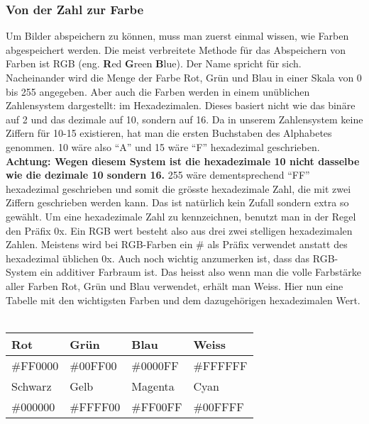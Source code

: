 \subsubsection{Von der Zahl zur Farbe}
Um Bilder abspeichern zu können, muss man zuerst einmal wissen, wie Farben abgespeichert werden. Die meist verbreitete Methode für das Abspeichern von Farben ist RGB (eng. \textbf{R}ed \textbf{G}reen \textbf{B}lue). Der Name spricht für sich. Nacheinander wird die Menge der Farbe Rot, Grün und Blau in einer Skala von 0 bis 255 angegeben. Aber auch die Farben werden in einem unüblichen Zahlensystem dargestellt: im Hexadezimalen. Dieses basiert nicht wie das binäre auf 2 und das dezimale auf 10, sondern auf 16. Da in unserem Zahlensystem keine Ziffern für 10-15 existieren, hat man die ersten Buchstaben des Alphabetes genommen. 10 wäre also "`A"' und 15 wäre "`F"' hexadezimal geschrieben. \textbf{Achtung: Wegen diesem System ist die hexadezimale 10 nicht dasselbe wie die dezimale 10 sondern 16.} 255 wäre dementsprechend "`FF"' hexadezimal geschrieben und somit die grösste hexadezimale Zahl, die mit zwei Ziffern geschrieben werden kann. Das ist natürlich kein Zufall sondern extra so gewählt. Um eine hexadezimale Zahl zu kennzeichnen, benutzt man in der Regel den Präfix 0x. Ein RGB wert besteht also aus drei zwei stelligen hexadezimalen Zahlen. Meistens wird bei RGB-Farben ein \# als Präfix verwendet anstatt des hexadezimal üblichen 0x. Auch noch wichtig anzumerken ist, dass das RGB-System ein additiver Farbraum ist. Das heisst also wenn man die volle Farbstärke aller Farben Rot, Grün und Blau verwendet, erhält man Weiss. Hier nun eine Tabelle mit den wichtigsten Farben und dem dazugehörigen hexadezimalen Wert. \\
\\
\begin{center}
\begin{tabular}{|l|l|l|l|}
\hline
Rot & Grün & Blau & Weiss \\ \hline
\#FF0000  & \#00FF00 & \#0000FF & \#FFFFFF \\ \hline\lstset{language=Pascal} 
Schwarz & Gelb & Magenta & Cyan \\ \hline
\#000000 & \#FFFF00 & \#FF00FF & \#00FFFF \\ \hline
\end{tabular} \\
\end{center}
